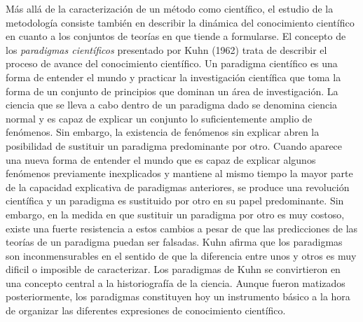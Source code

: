 \documentclass{nuevotema}
\begin{document}
Más allá de la caracterización de un método como científico, el estudio de la metodología consiste también en describir la dinámica del conocimiento científico en cuanto a los conjuntos de teorías en que tiende a formularse. El concepto de los \textit{paradigmas científicos} presentado por Kuhn (1962) trata de describir el proceso de avance del conocimiento científico. Un paradigma científico es una forma de entender el mundo y practicar la investigación científica que toma la forma de un conjunto de principios que dominan un área de investigación. La ciencia que se lleva a cabo dentro de un paradigma dado se denomina ciencia normal y es capaz de explicar un conjunto lo suficientemente amplio de fenómenos. Sin embargo, la existencia de fenómenos sin explicar abren la posibilidad de sustituir un paradigma predominante por otro. Cuando aparece una nueva forma de entender el mundo que es capaz de explicar algunos fenómenos previamente inexplicados y mantiene al mismo tiempo la mayor parte de la capacidad explicativa de paradigmas anteriores, se produce una revolución científica y un paradigma es sustituido por otro en su papel predominante. Sin embargo, en la medida en que sustituir un paradigma por otro es muy costoso, existe una fuerte resistencia a estos cambios a pesar de que las predicciones de las teorías de un paradigma puedan ser falsadas. Kuhn afirma que los paradigmas son inconmensurables en el sentido de que la diferencia entre unos y otros es muy dificil o imposible de caracterizar. Los paradigmas de Kuhn se convirtieron en una concepto central a la historiografía de la ciencia. Aunque fueron matizados posteriormente, los paradigmas constituyen hoy un instrumento básico a la hora de organizar las diferentes expresiones de conocimiento científico. 
\end{document}
